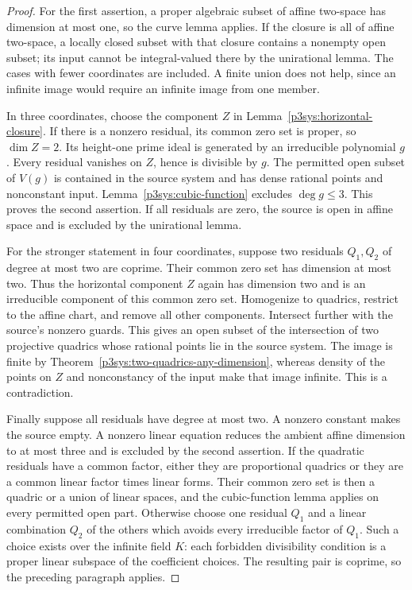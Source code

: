 \documentclass[11pt]{article}
\theoremstyle{definition}
\begin{document}
\begin{proof}
For the first assertion, a proper algebraic subset of affine
two-space has dimension at most one, so the curve lemma applies.
If the closure is all of affine two-space, a locally closed subset
with that closure contains a nonempty open subset; its input cannot
be integral-valued there by the unirational lemma.  The cases with
fewer coordinates are included.  A finite union does not help,
since an infinite image would require an infinite image from one
member.

In three coordinates, choose the component $Z$ in
Lemma~\ref{p3sys:horizontal-closure}.  If there is a nonzero
residual, its common zero set is proper, so $\dim Z=2$.  Its
height-one prime ideal is generated by an irreducible polynomial
$g$.  Every residual vanishes on $Z$, hence is divisible by $g$.
The permitted open subset of $V(g)$ is contained in the source
system and has dense rational points and nonconstant input.
Lemma~\ref{p3sys:cubic-function} excludes $\deg g\le3$.
This proves the second assertion.  If all residuals are zero,
the source is open in affine space and is excluded by the
unirational lemma.

For the stronger statement in four coordinates, suppose two
residuals $Q_1,Q_2$ of degree at most two are coprime.  Their
common zero set has dimension at most two.  Thus the horizontal
component $Z$ again has dimension two and is an irreducible
component of this common zero set.  Homogenize to quadrics,
restrict to the affine chart, and remove all other components.
Intersect further with the source's nonzero guards.  This gives
an open subset of the intersection of two projective quadrics
whose rational points lie in the source system.  The image is
finite by Theorem~\ref{p3sys:two-quadrics-any-dimension}, whereas
density of the points on $Z$ and nonconstancy of the input make
that image infinite.  This is a contradiction.

Finally suppose all residuals have degree at most two.  A nonzero
constant makes the source empty.  A nonzero linear equation reduces
the ambient affine dimension to at most three and is excluded by
the second assertion.  If the quadratic residuals have a common
factor, either they are proportional quadrics or they are a common
linear factor times linear forms.  Their common zero set is then
a quadric or a union of linear spaces, and the cubic-function
lemma applies on every permitted open part.  Otherwise choose
one residual $Q_1$ and a linear combination $Q_2$ of the others
which avoids every irreducible factor of $Q_1$.  Such a choice
exists over the infinite field $K$: each forbidden divisibility
condition is a proper linear subspace of the coefficient choices.
The resulting pair is coprime, so the preceding paragraph applies.
\end{proof}
\end{document}
